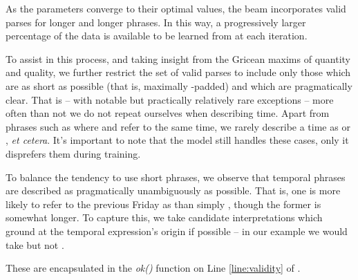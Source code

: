 As the parameters converge to their optimal values, the beam incorporates
	valid parses for longer and longer phrases.
In this way, a progressively larger percentage of the data is available to be
	learned from at each iteration.

To assist in this process, and taking insight from the Gricean 
	maxims of quantity and quality, we further restrict the set of valid 
	parses to include only those which are as short as possible
	(that is, maximally -padded) and which are pragmatically clear.
That is -- with notable but practically relatively rare exceptions --
	more often than not we do not repeat ourselves when describing time.
Apart from phrases such as  where 
	and  refer to the same time, we rarely describe a time as
	 or , \textit{et cetera}.
It's important to note that the model still handles these cases, only it
	disprefers them during training.

To balance the tendency to use short phrases, we observe that
	temporal phrases are described as pragmatically unambiguously as possible.
That is, one is more likely to refer to the previous Friday as 
	than simply , though the former is somewhat longer.
To capture this, we take candidate interpretations which ground at the
	temporal expression's origin if possible --
	in our example we would take  but not .

These are encapsulated in the \textit{ok()} function
	on Line \ref{line:validity} of .

